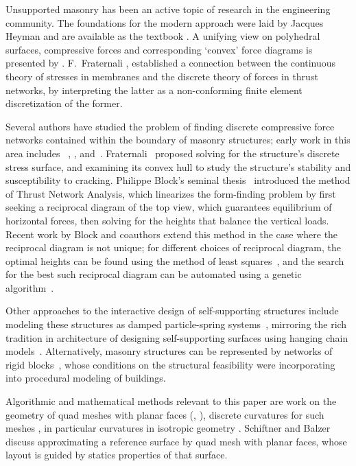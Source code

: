 \documentclass[annual]{acmsiggraph}
\begin{document}
Unsupported masonry has been an active topic of research in the 
engineering community. The foundations for the modern approach were laid 
by Jacques Heyman  and are available as the textbook 
\cite{Heyman95}. A unifying view on polyhedral surfaces, compressive 
forces and corresponding `convex' force diagrams is presented by 
\cite{Ash1988}. F.~Fraternali , 
 established a connection between the continuous 
theory of stresses in membranes and the discrete theory of forces in 
thrust networks, by interpreting the latter as a non-conforming finite 
element discretization of the former.

Several authors have studied the problem of finding discrete compressive 
force networks contained within the boundary of masonry structures; early 
work in this area includes \ \cite{schek74}, \cite{Livesley92}, and\ 
\cite{O'Dwyer98}. Fraternali~ proposed solving 
for the structure's discrete stress surface, and examining its convex hull 
to study the structure's stability and susceptibility to cracking. 
Philippe Block's seminal thesis~\shortcite{Block07} introduced the method 
of Thrust Network Analysis, which linearizes the form-finding problem by 
first seeking a reciprocal diagram of the top view, which guarantees 
equilibrium of horizontal forces, then solving for the heights that 
balance the vertical loads. Recent work by Block and coauthors extend this 
method in the case where the reciprocal diagram is not unique; for 
different choices of reciprocal diagram, the optimal heights can be found 
using the method of least squares~\cite{vanmele2011}, and the search for 
the best such reciprocal diagram can be automated using a genetic 
algorithm~\cite{Block2011}.

Other approaches to the interactive design of self-supporting structures 
include modeling these structures as damped particle-spring 
systems~\cite{Kilian2005}, mirroring the rich tradition in architecture of 
designing self-supporting surfaces using hanging chain 
models~\cite{Heyman98}. Alternatively, masonry structures can be 
represented by networks of rigid blocks~\cite{Whiting09}, whose conditions 
on the structural feasibility were incorporating into procedural modeling 
of buildings.

Algorithmic and mathematical methods relevant to this paper are work on 
the geometry of quad meshes with planar faces (\cite{Glymph2004}, 
\cite{Liu2006}), discrete curvatures for such meshes \cite{Pottmann2007b}, 
in particular curvatures in isotropic geometry \cite{Pottmann2007}. 
Schiftner and Balzer \shortcite{Schiftner2010} discuss approximating a 
reference surface by quad mesh with planar faces, whose layout is guided 
by statics properties of that surface.
\end{document}
